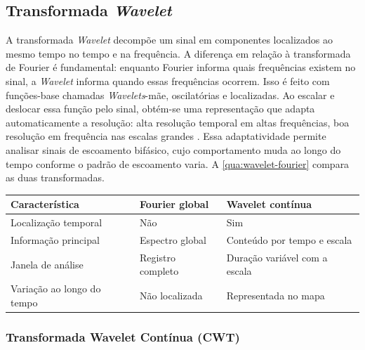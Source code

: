 \subsection{Transformada \textit{Wavelet}}\label{sec:wavelet}

A transformada \textit{Wavelet} decompõe um sinal em componentes localizados ao mesmo
tempo no tempo e na frequência. A diferença em relação à transformada de Fourier é
fundamental: enquanto Fourier informa quais frequências existem no sinal, a
\textit{Wavelet} informa quando essas frequências ocorrem. Isso é feito com funções-base
chamadas \textit{Wavelets}-mãe, oscilatórias e localizadas. Ao escalar e deslocar
essa função pelo sinal, obtém-se uma representação que adapta automaticamente a resolução:
alta resolução temporal em altas frequências, boa resolução em frequência nas escalas
grandes \cite{torrence1998}. Essa adaptatividade permite analisar
sinais de escoamento bifásico, cujo comportamento muda ao longo do tempo conforme o padrão
de escoamento varia. A \autoref{qua:wavelet-fourier} compara as duas transformadas.

\begin{quadro}[htb]
  \centering
  \caption{Comparação entre a transformada de Fourier e a transformada \textit{Wavelet}.}
  \label{qua:wavelet-fourier}
  \begin{tabular}{lll}
    \hline
    \textbf{Característica}       & \textbf{Fourier global} & \textbf{Wavelet contínua}   \\
    \hline
    Localização temporal          & Não                  & Sim                            \\
    Informação principal          & Espectro global      & Conteúdo por tempo e escala    \\
    Janela de análise              & Registro completo    & Duração variável com a escala  \\
    Variação ao longo do tempo     & Não localizada       & Representada no mapa           \\
    \hline
  \end{tabular}
\end{quadro}

\subsubsection{Transformada Wavelet Contínua (CWT)}\label{sec:cwt}

